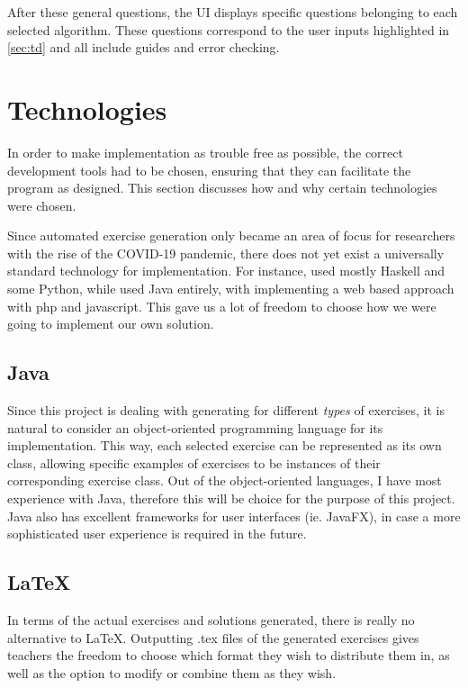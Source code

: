 \documentclass{l4proj}
\begin{document}
After these general questions, the UI displays specific questions belonging to each selected algorithm. These questions correspond to the user inputs highlighted in \autoref{sec:td} and all include guides and error checking.

\section{Technologies}

In order to make implementation as trouble free as possible, the correct development tools had to be chosen, ensuring that they can facilitate the program as designed. This section discusses how and why certain technologies were chosen.

Since automated exercise generation only became an area of focus for researchers with the rise of the COVID-19 pandemic, there does not yet exist a universally standard technology for implementation. For instance, \citet{Hoz21} used mostly Haskell and some Python, while \citet {Esh22} used Java entirely, with \citet{Kot19} implementing a web based approach with php and javascript. This gave us a lot of freedom to choose how we were going to implement our own solution. 

\subsection{Java}

Since this project is dealing with generating for different \emph{types} of exercises, it is natural to consider an object-oriented programming language for its implementation. This way, each selected exercise can be represented as its own class, allowing specific examples of exercises to be instances of their corresponding exercise class. Out of the object-oriented languages, I have most experience with Java, therefore this will be choice for the purpose of this project. Java also has excellent frameworks for user interfaces (ie. JavaFX), in case a more sophisticated user experience is required in the future.

\subsection{LaTeX}

In terms of the actual exercises and solutions generated, there is really no alternative to LaTeX. Outputting .tex files of the generated exercises gives teachers the freedom to choose which format they wish to distribute them in, as well as the option to modify or combine them as they wish.
 
\end{document}
